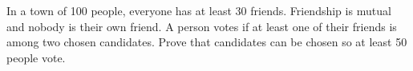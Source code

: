 In a town of 100 people, everyone has at least 30 friends. Friendship is mutual and nobody is their own friend. A person votes if at least one of their friends is among two chosen candidates. Prove that candidates can be chosen so at least 50 people vote.
